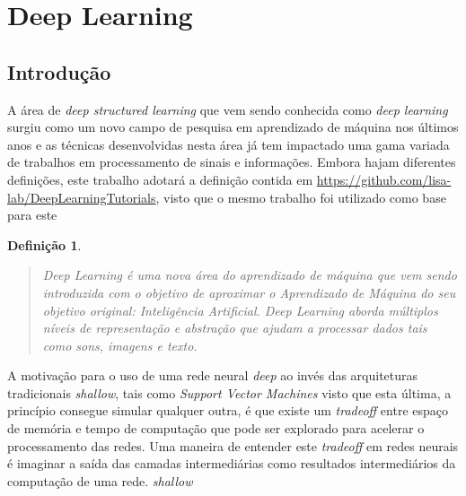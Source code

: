 
\section{Deep Learning}

\subsection{Introdução}

A área de \emph{deep structured learning} que vem sendo conhecida como
\emph{deep learning} surgiu como um novo campo de pesquisa em aprendizado de
máquina nos últimos anos e as técnicas desenvolvidas nesta área já tem
impactado uma gama variada de trabalhos em processamento de sinais e
informações. Embora hajam diferentes definições, este trabalho adotará a
definição contida em \url{https://github.com/lisa-lab/DeepLearningTutorials},
visto que o mesmo trabalho foi utilizado como base para este\cite{deng2014deep}

\newtheorem{def-deep-learning}{Definição}

\begin{def-deep-learning}

  \begin{quote}

    \emph{Deep Learning} é uma nova área do aprendizado de máquina que vem
    sendo introduzida com o objetivo de aproximar o Aprendizado de Máquina do
    seu objetivo original: Inteligência Artificial. \emph{Deep Learning} aborda
    múltiplos níveis de representação e abstração que ajudam a processar dados
    tais como sons, imagens e texto.

  \end{quote}

\end{def-deep-learning}

A motivação para o uso de uma rede neural \emph{deep} ao invés das arquiteturas
tradicionais \emph{shallow}, tais como \emph{Support Vector Machines} visto que
esta última, a princípio consegue simular qualquer outra, é que existe um
\emph{tradeoff} entre espaço de memória e tempo de computação que pode ser
explorado para acelerar o processamento das redes. Uma maneira de entender este
\emph{tradeoff} em redes neurais é imaginar a saída das camadas intermediárias
como resultados intermediários da computação de uma rede.
\emph{shallow}\cite{bengio2007scaling}

